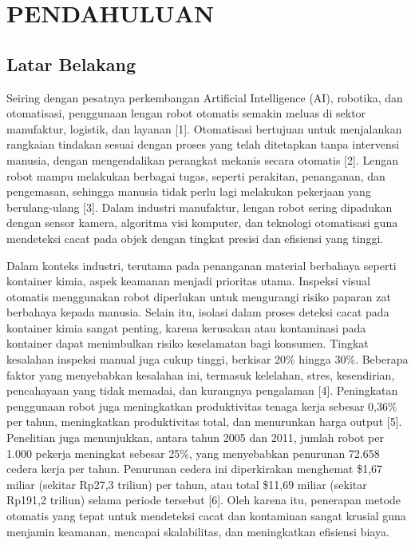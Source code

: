 \chapter{PENDAHULUAN}
\section{Latar Belakang}
Seiring dengan pesatnya perkembangan Artificial Intelligence (AI),
robotika, dan otomatisasi, penggunaan lengan robot otomatis semakin
meluas di sektor manufaktur, logistik, dan layanan [1]. Otomatisasi
bertujuan untuk menjalankan rangkaian tindakan sesuai dengan proses
yang telah ditetapkan tanpa intervensi manusia, dengan mengendalikan
perangkat mekanis secara otomatis [2]. Lengan robot mampu melakukan
berbagai tugas, seperti perakitan, penanganan, dan pengemasan,
sehingga manusia tidak perlu lagi melakukan pekerjaan yang
berulang-ulang [3]. Dalam industri manufaktur, lengan robot sering
dipadukan dengan sensor kamera, algoritma visi komputer, dan
teknologi otomatisasi guna mendeteksi cacat pada objek dengan tingkat
presisi dan efisiensi yang tinggi. \par

Dalam konteks industri, terutama pada penanganan material berbahaya
seperti kontainer kimia, aspek keamanan menjadi prioritas utama.
Inspeksi visual otomatis menggunakan robot diperlukan untuk
mengurangi risiko paparan zat berbahaya kepada manusia. Selain itu,
isolasi dalam proses deteksi cacat pada kontainer kimia sangat
penting, karena kerusakan atau kontaminasi pada kontainer dapat
menimbulkan risiko keselamatan bagi konsumen. Tingkat kesalahan
inspeksi manual juga cukup tinggi, berkisar 20\% hingga 30\%.
Beberapa faktor yang menyebabkan kesalahan ini, termasuk kelelahan,
stres, kesendirian, pencahayaan yang tidak memadai, dan kurangnya
pengalaman [4]. Peningkatan penggunaan robot juga meningkatkan
produktivitas tenaga kerja sebesar 0,36\% per tahun, meningkatkan
produktivitas total, dan menurunkan harga output [5]. Penelitian juga
menunjukkan, antara tahun 2005 dan 2011, jumlah robot per 1.000
pekerja meningkat sebesar 25\%, yang menyebabkan penurunan 72.658
cedera kerja per tahun. Penurunan cedera ini diperkirakan menghemat
\$1,67 miliar (sekitar Rp27,3 triliun) per tahun, atau total \$11,69
miliar (sekitar Rp191,2 triliun) selama periode tersebut [6]. Oleh
karena itu, penerapan metode otomatis yang tepat untuk mendeteksi
cacat dan kontaminan sangat krusial guna menjamin keamanan, mencapai
skalabilitas, dan meningkatkan efisiensi biaya.

